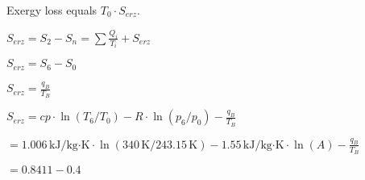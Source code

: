 Exergy loss equals \( T_0 \cdot S_{erz} \).  

\( S_{erz} = S_2 - S_n = \sum \frac{Q_i}{T_i} + S_{erz} \)  

\( S_{erz} = S_6 - S_0 \)  

\( S_{erz} = \frac{q_B}{T_B} \)  

\( S_{erz} = cp \cdot \ln(T_6/T_0) - R \cdot \ln(p_6/p_0) - \frac{q_B}{T_B} \)  

\( = 1.006 \, \text{kJ/kg·K} \cdot \ln(340 \, \text{K}/243.15 \, \text{K}) - 1.55 \, \text{kJ/kg·K} \cdot \ln(A) - \frac{q_B}{T_B} \)  

\( = 0.8411 - 0.4 \)